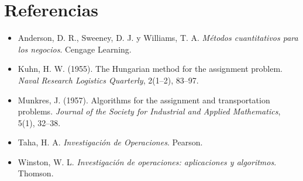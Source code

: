 \documentclass[11pt,a4paper]{article}
\begin{document}
\section*{Referencias}
\begin{itemize}[leftmargin=*, itemsep=0pt, topsep=2pt]
  \item Anderson, D. R., Sweeney, D. J. y Williams, T. A. \textit{Métodos cuantitativos para los negocios}. Cengage Learning.
  \item Kuhn, H. W. (1955). The Hungarian method for the assignment problem. \textit{Naval Research Logistics Quarterly}, 2(1--2), 83--97.
  \item Munkres, J. (1957). Algorithms for the assignment and transportation problems. \textit{Journal of the Society for Industrial and Applied Mathematics}, 5(1), 32--38.
  \item Taha, H. A. \textit{Investigación de Operaciones}. Pearson.
  \item Winston, W. L. \textit{Investigación de operaciones: aplicaciones y algoritmos}. Thomson.
\end{itemize}
\end{document}
